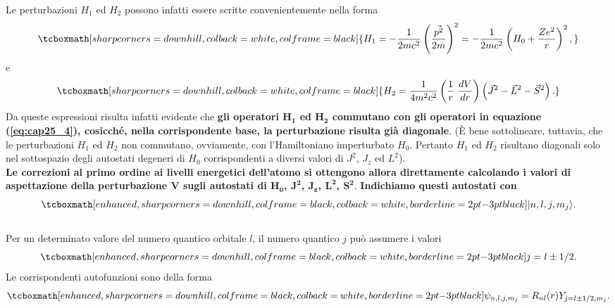Le perturbazioni $H_1$ ed $H_2$ possono infatti essere scritte convenientemente nella forma
	\begin{equation}
	\label{eq:cap25_5}
		\tcboxmath[sharp corners=downhill, colback=white, colframe=black]{
			H_1=-\frac{1}{2mc^2} \left( \frac{\vec{p^2}}{2m} \right)^2 = -\frac{1}{2mc^2} \left( H_0+\frac{Ze^2}{r} \right)^2 ,
			}
	\end{equation}
e
	\begin{equation}
	\label{eq:cap25_6}
		\tcboxmath[sharp corners=downhill, colback=white, colframe=black]{
			H_2=\frac{1}{4m^2c^2} \left( \frac{1}{r} \ \frac{dV}{dr} \right) \left(\vec{J}^2-\vec{L}^2-\vec{S}^2 \right) .
			}
	\end{equation}
Da queste espressioni risulta infatti evidente che \textbf{gli operatori $\boldsymbol{H_1}$ ed $\boldsymbol{H_2}$ commutano con gli operatori in equazione (\ref{eq:cap25_4}), cosicché, nella corrispondente base, la perturbazione risulta già diagonale}. (È bene sottolineare, tuttavia, che le perturbazioni $H_1$ ed $H_2$ non commutano, ovviamente, con l'Hamiltoniano imperturbato $H_0$. Pertanto $H_1$ ed $H_2$ risultano diagonali solo nel sottospazio degli autostati degeneri di $H_0$ corrispondenti a diversi valori di $J^2$, $J_z$ ed $L^2$). \\

\textbf{Le correzioni al primo ordine ai livelli energetici dell'atomo si ottengono allora direttamente calcolando i valori di aspettazione della perturbazione $\boldsymbol{V}$ sugli autostati di $\boldsymbol{H_0}$, $\boldsymbol{J^2}$, $\boldsymbol{J_z}$, $\boldsymbol{L^2}$, $\boldsymbol{S^2}$}. \textbf{Indichiamo questi autostati con}
	\begin{equation} 
		\tcboxmath[enhanced, sharp corners=downhill, colframe=black, colback=white, borderline={2pt}{-3pt}{black}]{
			| n,l,j,m_j \rangle .
			}
	\end{equation}\\
	
Per un determinato valore del numero quantico orbitale $l$, il numero quantico $j$ può assumere i valori
	\begin{equation} 
		\tcboxmath[enhanced, sharp corners=downhill, colframe=black, colback=white, borderline={2pt}{-3pt}{black}]{
			j=l\pm1/2 .
			}
	\end{equation}
Le corrispondenti autofunzioni sono della forma
	\begin{equation} 
		\tcboxmath[enhanced, sharp corners=downhill, colframe=black, colback=white, borderline={2pt}{-3pt}{black}]{		\psi_{n,l,j,m_j}=R_{nl}(r)Y_{j=l\pm1/2,m_j} .
		}
	\end{equation}\\
	
